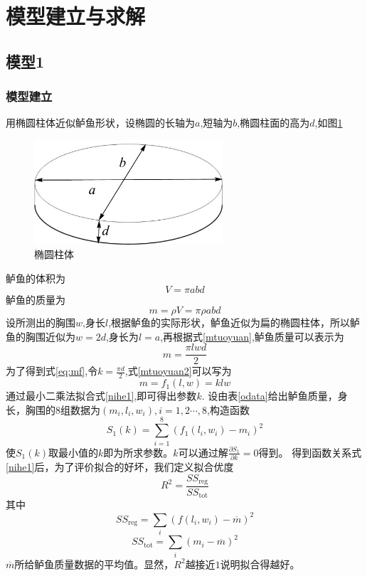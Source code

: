\documentclass[UTF8,a4paper]{ctexart}
\numberwithin{equation}{section}%
\numberwithin{table}{section}
\numberwithin{figure}{section}
\begin{document}
\section{模型建立与求解}
\subsection{模型1}
\subsubsection{模型建立}
用椭圆柱体近似鲈鱼形状，设椭圆的长轴为$a$,短轴为$b$,椭圆柱面的高为$d$,如图\ref{tuoyuan}
\begin{figure}[!htp]
	\centering
	\includegraphics[width=7cm]{tuoyuan.pdf}
	\caption{椭圆柱体}
	\label{tuoyuan}
\end{figure}
鲈鱼的体积为\begin{equation}
	V=\pi a b d
	\label{Vtuoyuan}
\end{equation}
鲈鱼的质量为\begin{equation}
		m=\rho V=\pi \rho a b d
	\label{mtuoyuan}
\end{equation}
设所测出的胸围$w$,身长$l$,根据鲈鱼的实际形状，鲈鱼近似为扁的椭圆柱体，所以鲈鱼的胸围近似为$w=2d$,身长为$l=a$,再根据式\eqref{mtuoyuan},鲈鱼质量可以表示为\begin{equation}
	m=\frac{\pi l w d}{2}
	\label{mtuoyuan2}
\end{equation}
为了得到式\eqref{eq:mf},令$k=\frac{\pi d}{2}$,式\eqref{mtuoyuan2}可以写为\begin{equation}
	m=f_1(l,w)=k l w
	\label{nihe1}
\end{equation}
通过最小二乘法拟合式\eqref{nihe1},即可得出参数$k$.
设由表\ref{odata}给出鲈鱼质量，身长，胸围的8组数据为$(m_i,l_i,w_i),i=1,2\cdots,8$,构造函数\begin{equation}
	S_1(k)=\sum_{i=1}^8(f_1(l_i,w_i)-m_i)^2
	\label{zuixiao1}
\end{equation}
使$S_1(k)$取最小值的$k$即为所求参数。$k$可以通过解$\frac{\partial S_1}{\partial k}=0$得到。
得到函数关系式\eqref{nihe1}后，为了评价拟合的好坏，我们定义拟合优度\cite{b3}
\begin{equation}
	R^2=\frac{SS_{\mathrm{reg}}}{SS_{\mathrm{tot}}}
	\label{rsquare}
\end{equation}
其中\begin{equation}
	SS_{\mathrm{reg}}=\sum_i (f(l_i,w_i)-\overline{m})^2
	\label{SSreg}
\end{equation}
\begin{equation}
	SS_{\mathrm{tot}}=\sum _i (m_i-\overline{m})^2
	\label{SStot}
\end{equation}
$\overline{m}$所给鲈鱼质量数据的平均值。显然，$R^2$越接近$1$说明拟合得越好。
\end{document}
